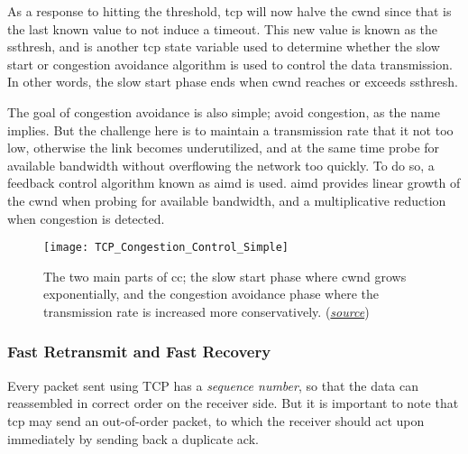 As a response to hitting the threshold, \gls{tcp} will now halve the \gls{cwnd} since that is the last known value to not induce a timeout. This new value is known as the \gls{ssthresh}, and is another \gls{tcp} state variable used to determine whether the slow start or congestion avoidance algorithm is used to control the data transmission. In other words, the slow start phase ends when \gls{cwnd} reaches or exceeds \gls{ssthresh}.

The goal of congestion avoidance is also simple; avoid congestion, as the name implies. But the challenge here is to maintain a transmission rate that it not too low, otherwise the link becomes underutilized, and at the same time probe for available bandwidth without overflowing the network too quickly. To do so, a feedback control algorithm known as \gls{aimd} is used. \gls{aimd} provides linear growth of the \gls{cwnd} when probing for available bandwidth, and a multiplicative reduction when congestion is detected.

\begin{figure}[H]
    \centering
    \texttt{[image: TCP\_Congestion\_Control\_Simple]}
    \captionsetup{width=0.7\textwidth}
    \caption{The two main parts of \gls{cc}; the slow start phase where \gls{cwnd} grows exponentially, and the congestion avoidance phase where the transmission rate is increased more conservatively. (\href{https://hpbn.co/building-blocks-of-tcp/}{\textit{source}})}
\end{figure}



\subsubsection{Fast Retransmit and Fast Recovery}

Every packet sent using TCP has a \textit{sequence number}, so that the data can reassembled in correct order on the receiver side. But it is important to note that \gls{tcp} may send an out-of-order packet, to which the receiver should act upon immediately by sending back a duplicate \gls{ack}.








